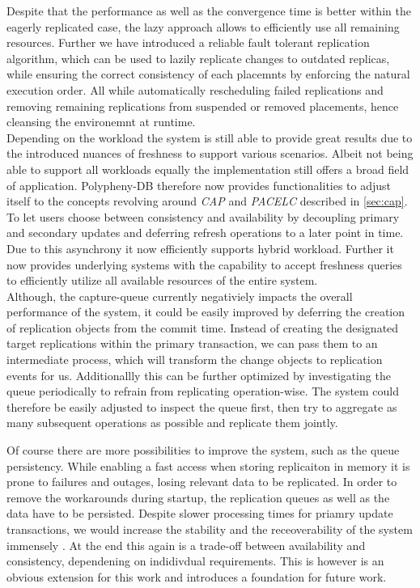 Despite that the performance as well as the convergence time is better within the eagerly replicated case, 
the lazy approach allows to efficiently use all remaining resources. 
Further we have introduced a reliable fault tolerant replication algorithm, which can be used to lazily replicate changes to outdated replicas,
while ensuring the correct consistency of each placemnts by enforcing the natural execution order. All while automatically rescheduling failed replications 
and removing remaining replications from suspended or removed placements, hence cleansing the environemnt at runtime.\\



Depending on the workload the system is still able to provide great results due to the introduced nuances of freshness to support various scenarios.
Albeit not being able to support all workloads equally the implementation still offers a broad field of application.
Polypheny-DB therefore now provides functionalities to adjust itself to the concepts revolving around \emph{CAP} and \emph{PACELC} described in \ref{sec:cap}.
To let users choose between consistency and availability by decoupling primary and secondary updates and deferring refresh operations to a later point in time.
Due to this asynchrony it now efficiently supports hybrid workload. Further it now provides underlying systems with the capability to accept freshness queries to efficiently
utilize all available resources of the entire system.\\



Although, the capture-queue currently negativiely impacts the overall performance of the system,
it could be easily improved by deferring the creation of replication objects from the commit time.
Instead of creating the designated target replications within the primary transaction, we can pass them to an intermediate process, 
which will transform the change objects to replication events for us.
Additionallly this can be further optimized by investigating the queue periodically to refrain from replicating operation-wise.
The system could therefore be easily adjusted to inspect the queue first, then try to aggregate as many subsequent operations as possible
and replicate them jointly.



Of course there are more possibilities to improve the system, such as the queue persistency. While enabling a fast access when storing replicaiton in memory it is prone to 
failures and outages, losing relevant data to be replicated. In order to remove the workarounds during startup, the replication queues as well as the data have 
to be persisted. Despite slower processing times for priamry update transactions, we would increase the stability and the receoverability of the system immensely .
At the end this again is a trade-off between availability and consistency, dependening on indidivdual requirements.
This is however is an obvious extension for this work and introduces a foundation for future work.


